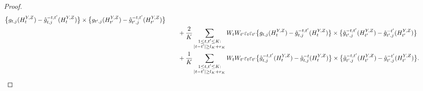 \documentclass[12pt]{article}
\numberwithin{equation}{section}
\begin{document}
\begin{proof}
\begin{align}
\big\{g_{t,j}(H_t^{Y,Z})
      -\hat g_{t,j}^{-t,t'}(H_t^{Y,Z})\big\}\times
\big\{g_{t',j}(H_{t'}^{Y,Z})
      -\hat g_{t',j}^{-t,t'}(H_{t'}^{Y,Z})\big\}\notag\\
&\qquad{}+\frac2K\sum_{\substack{1\leq t,t'\leq K:\\
                               |t-t'|\geq l_K+r_K}}
W_tW_{t'}\varepsilon_t\varepsilon_{t'}
\big\{g_{t,j}(H_t^{Y,Z})
      -\hat g_{t,j}^{-t,t'}(H_t^{Y,Z})\big\}\times
\big\{\hat g_{t',j}^{-t,t'}(H_{t'}^{Y,Z})
      -\hat g_{t',j}^{-t'}(H_{t'}^{Y,Z})\big\}\notag\\
&\qquad{}+\frac1K\sum_{\substack{1\leq t,t'\leq K:\\
                               |t-t'|\geq l_K+r_K}}
W_tW_{t'}\varepsilon_t\varepsilon_{t'}
\big\{\hat g_{t,j}^{-t,t'}(H_t^{Y,Z})
      -\hat g_{t,j}^{-t}(H_t^{Y,Z})\big\}\times
\big\{\hat g_{t',j}^{-t,t'}(H_{t'}^{Y,Z})
      -\hat g_{t',j}^{-t'}(H_{t'}^{Y,Z})\big\}.
\label{eq:exposure-pair-expansion}
\end{align}


\end{proof}
\end{document}
